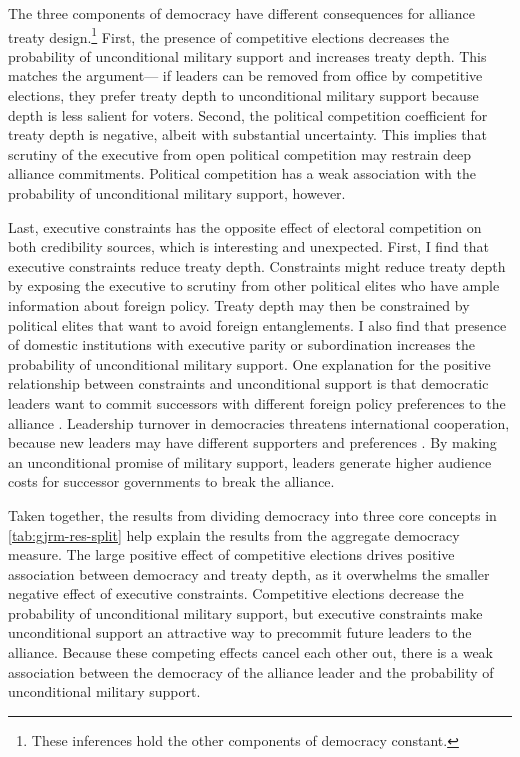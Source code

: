 \documentclass[12pt]{article}
\begin{document}
The three components of democracy have different consequences for alliance treaty design.\footnote{These inferences hold the other components of democracy constant.}
First, the presence of competitive elections decreases the probability of unconditional military support and increases treaty depth.
This matches the argument--- if leaders can be removed from office by competitive elections, they prefer treaty depth to unconditional military support because depth is less salient for voters. 
Second, the political competition coefficient for treaty depth is negative, albeit with substantial uncertainty. 
This implies that scrutiny of the executive from open political competition may restrain deep alliance commitments. 
Political competition has a weak association with the probability of unconditional military support, however. 


Last, executive constraints has the opposite effect of electoral competition on both credibility sources, which is interesting and unexpected.
First, I find that executive constraints reduce treaty depth.  
Constraints might reduce treaty depth by exposing the executive to scrutiny from other political elites who have ample information about foreign policy. 
Treaty depth may then be constrained by political elites that want to avoid foreign entanglements.  
I also find that presence of domestic institutions with executive parity or subordination increases the probability of unconditional military support.  
One explanation for the positive relationship between constraints and unconditional support is that democratic leaders want to commit successors with different foreign policy preferences to the alliance \cite{Mattes2012a}. 
Leadership turnover in democracies threatens international cooperation, because new leaders may have different supporters and preferences \citep{Lobell2004, Narizny2007, Leedsetal2009}. 
By making an unconditional promise of military support, leaders generate higher audience costs for successor governments to break the alliance. 


Taken together, the results from dividing democracy into three core concepts in \autoref{tab:gjrm-res-split} help explain the results from the aggregate democracy measure. 
The large positive effect of competitive elections drives positive association between democracy and treaty depth, as it overwhelms the smaller negative effect of executive constraints. 
Competitive elections decrease the probability of unconditional military support, but executive constraints make unconditional support an attractive way to precommit future leaders to the alliance. 
Because these competing effects cancel each other out, there is a weak association between the democracy of the alliance leader and the probability of unconditional military support. 
\end{document}
